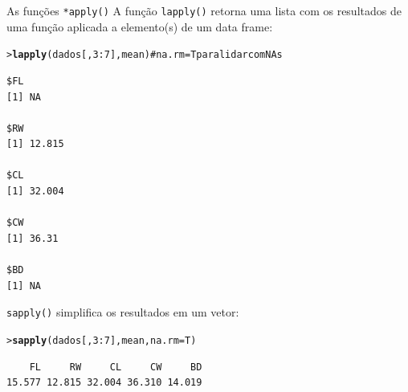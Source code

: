 \documentclass[10pt]{beamer}\usepackage{graphicx, color}
\makeatletter
\newcommand{\hlfunctioncall}[1]{\textcolor[rgb]{0,0,0.545098039215686}{\textbf{#1}}}%
\newcommand{\hlcomment}[1]{\textcolor[rgb]{0.2,0.2,0.2}{#1}}%
\newenvironment{kframe}{%
 \def\at@end@of@kframe{}%
 \ifinner\ifhmode%
  \def\at@end@of@kframe{\end{minipage}}%
  \begin{minipage}{\columnwidth}%
 \fi\fi%
 \def\FrameCommand##1{\hskip\@totalleftmargin \hskip-\fboxsep
 \colorbox{shadecolor}{##1}\hskip-\fboxsep
     \hskip-\linewidth \hskip-\@totalleftmargin \hskip\columnwidth}%
 \MakeFramed {\advance\hsize-\width
   \@totalleftmargin\z@ \linewidth\hsize
   \@setminipage}}%
 {\par\unskip\endMakeFramed%
 \at@end@of@kframe}
\newenvironment{knitrout}{}{} %
\makeatother
\begin{document}
\begin{frame}[fragile=singleslide]{As funções \texttt{*apply()}}
A função \texttt{lapply()} retorna uma lista com os resultados de uma
função aplicada a elemento(s) de um data frame:
\begin{knitrout}\small
{}\color{fgcolor}\begin{kframe}
\begin{alltt}
> \hlfunctioncall{lapply}(dados[, 3:7], mean) \hlcomment{# na.rm = T para lidar com NAs}
\end{alltt}
\begin{verbatim}
$FL
[1] NA

$RW
[1] 12.815

$CL
[1] 32.004

$CW
[1] 36.31

$BD
[1] NA

\end{verbatim}
\end{kframe}
\end{knitrout}

\texttt{sapply()} simplifica os resultados em um vetor:
\begin{knitrout}\small
{}\color{fgcolor}\begin{kframe}
\begin{alltt}
> \hlfunctioncall{sapply}(dados[, 3:7], mean, na.rm = T)
\end{alltt}
\begin{verbatim}
    FL     RW     CL     CW     BD 
15.577 12.815 32.004 36.310 14.019 
\end{verbatim}
\end{kframe}
\end{knitrout}

\end{frame}
\end{document}
